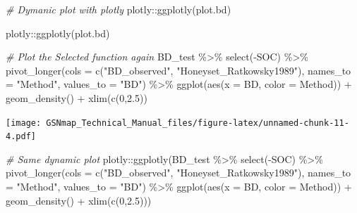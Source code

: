 \documentclass[
  10pt,
  b5paper,
  oneside]{book}
\newenvironment{Shaded}{\begin{snugshade}}{\end{snugshade}}
\newcommand{\AttributeTok}[1]{\textcolor[rgb]{0.77,0.63,0.00}{#1}}
\newcommand{\CommentTok}[1]{\textcolor[rgb]{0.56,0.35,0.01}{\textit{#1}}}
\newcommand{\DecValTok}[1]{\textcolor[rgb]{0.00,0.00,0.81}{#1}}
\newcommand{\FloatTok}[1]{\textcolor[rgb]{0.00,0.00,0.81}{#1}}
\newcommand{\FunctionTok}[1]{\textcolor[rgb]{0.00,0.00,0.00}{#1}}
\newcommand{\NormalTok}[1]{#1}
\newcommand{\SpecialCharTok}[1]{\textcolor[rgb]{0.00,0.00,0.00}{#1}}
\newcommand{\StringTok}[1]{\textcolor[rgb]{0.31,0.60,0.02}{#1}}
\begin{document}
\begin{Shaded}
\begin{Highlighting}[]
\CommentTok{\# Dymanic plot with plotly }
\NormalTok{plotly}\SpecialCharTok{::}\FunctionTok{ggplotly}\NormalTok{(plot.bd)}
\end{Highlighting}
\end{Shaded}

\begin{Shaded}
\begin{Highlighting}[]
\NormalTok{plotly}\SpecialCharTok{::}\FunctionTok{ggplotly}\NormalTok{(plot.bd) }
\end{Highlighting}
\end{Shaded}

\begin{Shaded}
\begin{Highlighting}[]
\CommentTok{\# Plot the Selected function again}
\NormalTok{BD\_test }\SpecialCharTok{\%\textgreater{}\%} 
  \FunctionTok{select}\NormalTok{(}\SpecialCharTok{{-}}\NormalTok{SOC) }\SpecialCharTok{\%\textgreater{}\%} 
  \FunctionTok{pivot\_longer}\NormalTok{(}\AttributeTok{cols =} \FunctionTok{c}\NormalTok{(}\StringTok{"BD\_observed"}\NormalTok{, }\StringTok{"Honeyset\_Ratkowsky1989"}\NormalTok{), }
               \AttributeTok{names\_to =} \StringTok{"Method"}\NormalTok{, }\AttributeTok{values\_to =} \StringTok{"BD"}\NormalTok{) }\SpecialCharTok{\%\textgreater{}\%} 
  \FunctionTok{ggplot}\NormalTok{(}\FunctionTok{aes}\NormalTok{(}\AttributeTok{x =}\NormalTok{ BD, }\AttributeTok{color =}\NormalTok{ Method)) }\SpecialCharTok{+} 
  \FunctionTok{geom\_density}\NormalTok{() }\SpecialCharTok{+} \FunctionTok{xlim}\NormalTok{(}\FunctionTok{c}\NormalTok{(}\DecValTok{0}\NormalTok{,}\FloatTok{2.5}\NormalTok{))}
\end{Highlighting}
\end{Shaded}

\texttt{[image: GSNmap\_Technical\_Manual\_files/figure-latex/unnamed-chunk-11-4.pdf]}

\begin{Shaded}
\begin{Highlighting}[]
\CommentTok{\# Same dynamic plot }
\NormalTok{plotly}\SpecialCharTok{::}\FunctionTok{ggplotly}\NormalTok{(BD\_test }\SpecialCharTok{\%\textgreater{}\%} 
           \FunctionTok{select}\NormalTok{(}\SpecialCharTok{{-}}\NormalTok{SOC) }\SpecialCharTok{\%\textgreater{}\%} 
           \FunctionTok{pivot\_longer}\NormalTok{(}\AttributeTok{cols =} \FunctionTok{c}\NormalTok{(}\StringTok{"BD\_observed"}\NormalTok{, }
                                 \StringTok{"Honeyset\_Ratkowsky1989"}\NormalTok{), }
                        \AttributeTok{names\_to =} \StringTok{"Method"}\NormalTok{, }\AttributeTok{values\_to =} \StringTok{"BD"}\NormalTok{) }\SpecialCharTok{\%\textgreater{}\%} 
           \FunctionTok{ggplot}\NormalTok{(}\FunctionTok{aes}\NormalTok{(}\AttributeTok{x =}\NormalTok{ BD, }\AttributeTok{color =}\NormalTok{ Method)) }\SpecialCharTok{+} 
           \FunctionTok{geom\_density}\NormalTok{() }\SpecialCharTok{+} \FunctionTok{xlim}\NormalTok{(}\FunctionTok{c}\NormalTok{(}\DecValTok{0}\NormalTok{,}\FloatTok{2.5}\NormalTok{))) }
\end{Highlighting}
\end{Shaded}
\end{document}
